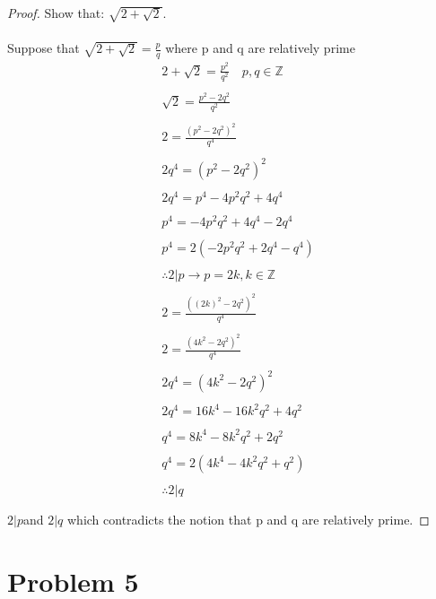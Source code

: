 \documentclass[12pt]{article}
\newcommand{\sect}[1]{\section*{#1}}
\newcommand{\Z}{\mathbb{Z}}
\theoremstyle{definition}
\theoremstyle{remark}
\numberwithin{equation}{section}
\begin{document}
\begin{proof}
  Show that: $\sqrt{2+\sqrt{2}}$. \\\\
  Suppose that  $\sqrt{2+\sqrt{2}}=\frac{p}{q}$ where p and q are relatively prime\\

  \begin{align*}
    &2+\sqrt{2}=\frac{p^2}{q^2}\quad p,q\in \Z\\\\
    &\sqrt{2}=\frac{p^2-2q^2}{q^2}\\\\
    &2=\frac{(p^2-2q^2)^2}{q^4}\\\\
    &2q^4=(p^2-2q^2)^2\\\\
    &2q^4=p^4-4p^2q^2+4q^4\\\\
    &p^4=-4p^2q^2+4q^4-2q^4\\\\
    &p^4=2(-2p^2q^2+2q^4-q^4)\\\\
    &\therefore 2|p\rightarrow p=2k, k \in \Z\\\\
    &2=\frac{((2k)^2-2q^2)^2}{q^4}\\\\
    &2=\frac{(4k^2-2q^2)^2}{q^4}\\\\
    &2q^4=(4k^2-2q^2)^2\\\\
    &2q^4=16k^4-16k^2q^2+4q^2\\\\
    &q^4=8k^4-8k^2q^2+2q^2\\\\
    &q^4=2(4k^4-4k^2q^2+q^2)\\\\
    &\therefore 2|q\\\\
  \end{align*}
  $2|p$and $2|q$ which contradicts the notion that p and q are relatively prime.
\end{proof}
\sect{Problem 5}
\end{document}
